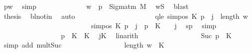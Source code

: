 \begin{isabellebody}
\ p{}w\ \isamarkupfalse%
\ simp\isanewline
\ \ \ \ \ \ \ \ \ \ \ \ \isamarkupfalse%
\ {\isachardoublequoteopen}w\ {\isacharbang}{\kern0pt}\ p{}\ {\isasymin}\ Sigma{\isacharunderscore}{\kern0pt}tm\ M{\isachardoublequoteclose}\ \isamarkupfalse%
\ wS\ \isamarkupfalse%
\ blast\isanewline
\ \ \ \ \ \ \ \ \ \ \ \ \isamarkupfalse%
\ {\isacharquery}{\kern0pt}thesis\ \isamarkupfalse%
\ bl{\isacharunderscore}{\kern0pt}notin\ \isamarkupfalse%
\ auto\isanewline
\ \ \ \ \ \ \ \ \ \ \isamarkupfalse%
\isanewline
\ \ \ \ \ \ \ \ \ \ \isamarkupfalse%
\ qle{\isacharcolon}{\kern0pt}\ {\isachardoublequoteopen}sim{\isacharunderscore}{\kern0pt}pos\ {\isacharquery}{\kern0pt}K\ p\ {\isacharplus}{\kern0pt}\ j\ {\isasymle}\ length\ {\isacharquery}{\kern0pt}w{\isacharprime}{\kern0pt}{\isachardoublequoteclose}\isanewline
\ \ \ \ \ \ \ \ \ \ \isamarkupfalse%
\ {\isacharminus}{\kern0pt}\isanewline
\ \ \ \ \ \ \ \ \ \ \ \ \isamarkupfalse%
\ {\isachardoublequoteopen}sim{\isacharunderscore}{\kern0pt}pos\ {\isacharquery}{\kern0pt}K\ p\ {\isacharplus}{\kern0pt}\ j\ {\isacharequal}{\kern0pt}\ p{}\ {\isacharasterisk}{\kern0pt}\ {\isacharquery}{\kern0pt}K\ {\isacharplus}{\kern0pt}\ {}\ {\isacharplus}{\kern0pt}\ j{\isachardoublequoteclose}\ \isamarkupfalse%
\ sp\ \isamarkupfalse%
\ simp\isanewline
\ \ \ \ \ \ \ \ \ \ \ \ \isamarkupfalse%
\ \isamarkupfalse%
\ {\isachardoublequoteopen}{\isasymdots}\ {\isasymle}\ p{}\ {\isacharasterisk}{\kern0pt}\ {\isacharquery}{\kern0pt}K\ {\isacharplus}{\kern0pt}\ {\isacharquery}{\kern0pt}K{\isachardoublequoteclose}\ \isamarkupfalse%
\ jK\ \isamarkupfalse%
\ linarith\isanewline
\ \ \ \ \ \ \ \ \ \ \ \ \isamarkupfalse%
\ \isamarkupfalse%
\ {\isachardoublequoteopen}{\isasymdots}\ {\isacharequal}{\kern0pt}\ Suc\ p{}\ {\isacharasterisk}{\kern0pt}\ {\isacharquery}{\kern0pt}K{\isachardoublequoteclose}\ \isamarkupfalse%
\ {\isacharparenleft}{\kern0pt}simp\ add{\isacharcolon}{\kern0pt}\ mult{\isacharunderscore}{\kern0pt}Suc{\isacharparenright}{\kern0pt}\isanewline
\ \ \ \ \ \ \ \ \ \ \ \ \isamarkupfalse%
\ \isamarkupfalse%
\ {\isachardoublequoteopen}{\isasymdots}\ {\isasymle}\ length\ w\ {\isacharasterisk}{\kern0pt}\ {\isacharquery}{\kern0pt}K{\isachardoublequoteclose}\isanewline

\end{isabellebody}

